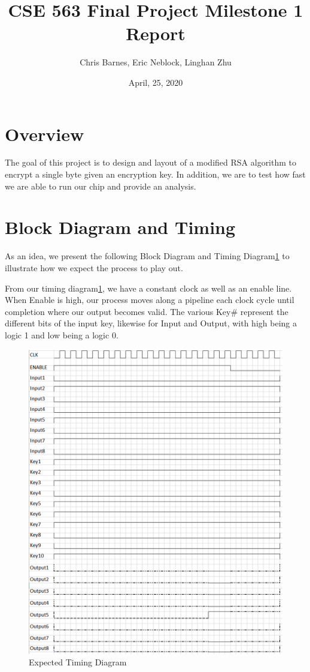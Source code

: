 \documentclass{article}
\title{CSE 563 Final Project Milestone 1 Report}
\author{Chris Barnes, Eric Neblock, Linghan Zhu}
\date{April, 25, 2020}
\begin{document}
\maketitle
\listoffigures
\newpage
\section{Overview}
The goal of this project is to design and layout of a modified RSA algorithm to
encrypt a single byte given an encryption key. In addition, we are to test how 
fast we are able to run our chip and provide an analysis.

\section{Block Diagram and Timing}
As an idea, we present the following Block Diagram and Timing 
Diagram\ref{fig:TimingDiagram} to illustrate how we expect the process to play 
out.

From our timing diagram\ref{fig:TimingDiagram}, we have a constant clock as well
as an enable line. When Enable is high, our process moves along a pipeline each
clock cycle until completion where our output becomes valid. The various Key\# 
represent the different bits of the input key, likewise for Input and Output, 
with high being a logic 1 and low being a logic 0.

\begin{figure}
  \includegraphics[width=\linewidth]{../img/TimingDiagram_Milestone1.png}
  \caption{Expected Timing Diagram}
  \label{fig:TimingDiagram}
\end{figure}
\end{document}
